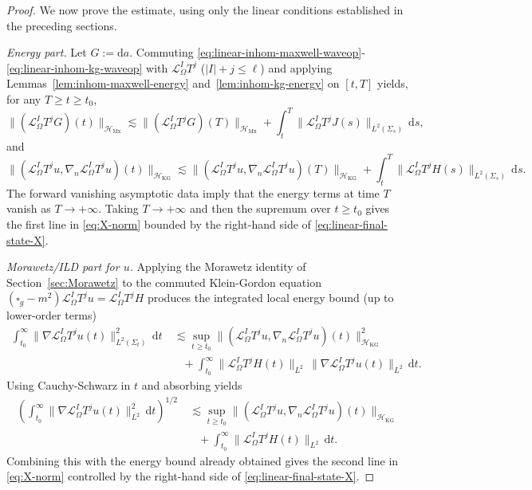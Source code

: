 \documentclass[11pt]{article}
\numberwithin{equation}{section}
\theoremstyle{plain}
\theoremstyle{definition}
\theoremstyle{remark}
\newcommand{\dd}{\mathrm{d}}
\begin{document}
\begin{proof}
We now prove the estimate, using only the linear conditions established in the preceding sections.

\medskip\noindent
\textit{Energy part.}
Let $G:=\dd a$.
Commuting \eqref{eq:linear-inhom-maxwell-waveop}-\eqref{eq:linear-inhom-kg-waveop} with $\mathcal L_{\Omega}^{I}T^{j}$ ($|I|+j\le\ell$) and applying
Lemmas~\ref{lem:inhom-maxwell-energy} and~\ref{lem:inhom-kg-energy} on $[t,T]$ yields, for any $T\ge t\ge t_0$,
\begin{equation}
\|(\mathcal L_{\Omega}^{I}T^{j}G)(t)\|_{\mathcal H_{\mathrm{Mx}}}
\lesssim
\|(\mathcal L_{\Omega}^{I}T^{j}G)(T)\|_{\mathcal H_{\mathrm{Mx}}}
+
\int_{t}^{T}\|\mathcal L_{\Omega}^{I}T^{j}J(s)\|_{L^{2}(\Sigma_s)}\,\dd s,
\end{equation}
and
\begin{equation}
\|(\mathcal L_{\Omega}^{I}T^{j}u,\nabla_n\mathcal L_{\Omega}^{I}T^{j}u)(t)\|_{\mathcal H_{\mathrm{KG}}}
\lesssim
\|(\mathcal L_{\Omega}^{I}T^{j}u,\nabla_n\mathcal L_{\Omega}^{I}T^{j}u)(T)\|_{\mathcal H_{\mathrm{KG}}}
+
\int_{t}^{T}\|\mathcal L_{\Omega}^{I}T^{j}H(s)\|_{L^{2}(\Sigma_s)}\,\dd s.
\end{equation}
The forward vanishing asymptotic data imply that the energy terms at time $T$ vanish as $T\to+\infty$.
Taking $T\to+\infty$ and then the supremum over $t\ge t_0$ gives the first line in \eqref{eq:X-norm} bounded by the right-hand side of \eqref{eq:linear-final-state-X}.

\medskip\noindent
\textit{Morawetz/ILD part for $u$.}
Applying the Morawetz identity of Section~\ref{sec:Morawetz} to the commuted Klein-Gordon equation
$(\square_g-m^{2})\mathcal L_{\Omega}^{I}T^{j}u=\mathcal L_{\Omega}^{I}T^{j}H$
produces the integrated local energy bound (up to lower-order terms)
\begin{eqnarray}
\int_{t_0}^{\infty}\|\nabla\mathcal L_{\Omega}^{I}T^{j}u(t)\|_{L^{2}(\Sigma_t)}^{2}\,\dd t
&\ \lesssim
\sup_{t\ge t_0}\|(\mathcal L_{\Omega}^{I}T^{j}u,\nabla_n\mathcal L_{\Omega}^{I}T^{j}u)(t)\|_{\mathcal H_{\mathrm{KG}}}^{2}
\\
&\quad+
\int_{t_0}^{\infty}\|\mathcal L_{\Omega}^{I}T^{j}H(t)\|_{L^{2}}\,
\|\nabla\mathcal L_{\Omega}^{I}T^{j}u(t)\|_{L^{2}}\,\dd t.
\end{eqnarray}
Using Cauchy-Schwarz in $t$ and absorbing yields
\begin{eqnarray}
\left(\int_{t_0}^{\infty}\|\nabla\mathcal L_{\Omega}^{I}T^{j}u(t)\|_{L^{2}}^{2}\,\dd t\right)^{1/2}
&\ \lesssim
\sup_{t\ge t_0}\|(\mathcal L_{\Omega}^{I}T^{j}u,\nabla_n\mathcal L_{\Omega}^{I}T^{j}u)(t)\|_{\mathcal H_{\mathrm{KG}}}
\\
&\quad+
\int_{t_0}^{\infty}\|\mathcal L_{\Omega}^{I}T^{j}H(t)\|_{L^{2}}\,\dd t.
\end{eqnarray}
Combining this with the energy bound already obtained gives the second line in \eqref{eq:X-norm} controlled by the right-hand side of \eqref{eq:linear-final-state-X}.


\end{proof}
\end{document}
